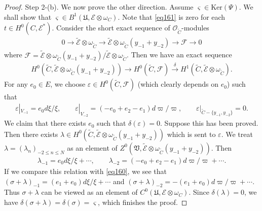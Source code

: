 \documentclass[12pt,a4paper,notitlepage]{report}
\theoremstyle{definition}
\theoremstyle{plain}
\newcommand{\fk}{\mathfrak}
\newcommand{\wtd}{\widetilde}
\newcommand{\scr}{\mathscr}
\newcommand{\sgm}{\varsigma}
\newcommand{\Ker}{\mathrm{Ker}}
\numberwithin{equation}{section}
\begin{document}
\begin{proof}
Step 2-(b). We now prove the other direction. Assume $\sgm\in\Ker(\Psi)$. We shall show that $\sgm\in B^1(\fk U,\scr E\otimes\omega_C)$. Note that \eqref{eq161} is zero for each $t\in H^0(C,\scr E^*)$. Consider the short exact sequence of $\scr O_{\wtd C}$-modules
\begin{align*}
0\rightarrow\wtd{\scr E}\otimes\omega_{\wtd C}\rightarrow \wtd{\scr E}\otimes\omega_{\wtd C}(y_{-1}+y_{-2})\rightarrow \scr F\rightarrow 0
\end{align*}
where $\scr F=\wtd{\scr E}\otimes\omega_{\wtd C}(y_{-1}+y_{-2})/\wtd{\scr E}\otimes\omega_{\wtd C}$. Then we have an exact sequence
\begin{align*}
H^0(\wtd C,\wtd{\scr E}\otimes\omega_{\wtd C}(y_{-1}+y_{-2}))\rightarrow H^0(\wtd C,\scr F)\xrightarrow{\delta} H^1(\wtd C,\wtd{\scr E}\otimes\omega_{\wtd C}).
\end{align*}
For any $e_0\in E$, we choose $\varepsilon\in H^0(\wtd C,\scr F)$ (which clearly depends on $e_0$) such that
\begin{gather*}
\varepsilon|_{V_{-1}}=e_0d\xi/\xi,\qquad \varepsilon|_{V_{-2}}=(-e_0+e_2-e_1)d\varpi/\varpi ,\qquad  \varepsilon|_{\wtd C-\{y_{-1},y_{-2}\}}=0.
\end{gather*}
We claim that there exists $e_0$ such that $\delta(\varepsilon)=0$. Suppose this has been proved. Then there exists $\lambda\in H^0(\wtd C,\wtd{\scr E}\otimes\omega_{\wtd C}(y_{-1}+y_{-2}))$ which is sent to $\varepsilon$. We treat $\lambda=(\lambda_n)_{-2\leq n\leq N}$ as an element of $Z^0(\fk V,\wtd{\scr E}\otimes\omega_{\wtd C}(y_{-1}+y_{-2}))$. Then
\begin{align*}
\lambda_{-1}=e_0d\xi/\xi+\cdots,\qquad \lambda_{-2}=(-e_0+e_2-e_1)d\varpi/\varpi+\cdots.
\end{align*}
If we compare this relation with \eqref{eq160},  we see that $(\sigma+\lambda)_{-1}=(e_1+e_0)d\xi/\xi+\cdots$ and $(\sigma+\lambda)_{-2}=-(e_1+e_0)d\varpi/\varpi+\cdots$. Thus $\sigma+\lambda$ can be viewed as an element of $C^0(\fk U,\scr E\otimes\omega_C)$. Since $\delta(\lambda)=0$, we have $\delta(\sigma+\lambda)=\delta(\sigma)=\sgm$, which finishes the proof.



\end{proof}
\end{document}
